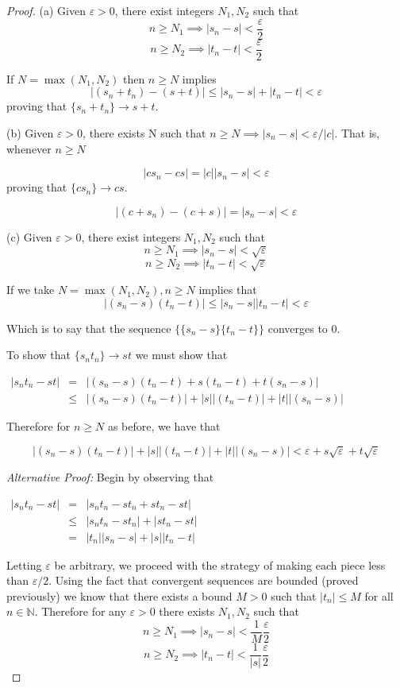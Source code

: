 \documentclass{tufte-book}
\theoremstyle{definition}
\numberwithin{section}{chapter}
\begin{document}
\begin{proof}
(a)  Given $\varepsilon > 0$, there exist integers $N_1, N_2$ such that 
\[n \geq N_1 \implies |s_n - s|< \frac{\varepsilon}{2}\]
\[n \geq N_2 \implies |t_n - t|< \frac{\varepsilon}{2}\]

If $N = \max(N_1, N_2)$ then $n\geq N$ implies
\[|(s_n + t_n)-(s + t)|\leq |s_n - s|+|t_n - t|<\varepsilon\] proving that $\{s_n + t_n\} \to s+t$.

(b)  Given $\varepsilon>0$, there exists N such that $n\geq N \implies |s_n-s|<\varepsilon/ |c|$.  That is, whenever $n\geq N$

\[|cs_n -cs |= |c||s_n - s|< \varepsilon\]  proving that $\{cs_n\} \to cs$.

\[|(c+s_n) - (c+s)| = |s_n - s| < \varepsilon\]

(c) Given $\varepsilon > 0$, there exist integers $N_1, N_2$ such that 
\[n \geq N_1 \implies |s_n - s|< \sqrt{\varepsilon}\]
\[n \geq N_2 \implies |t_n - t|< \sqrt{\varepsilon}\]

If we take $N = \max(N_1, N_2), n\geq N$ implies that 
\[|(s_n -s )(t_n -t)| \leq |s_n - s| |t_n -t| < \varepsilon\]

Which is to say that the sequence $\{\{s_n - s\}\{t_n - t\}\}$ converges to 0.

To show that $\{s_n t_n \} \to st$ we must show that 


$\begin{array} {lcl} 
|s_n t_n  - st|& = &|(s_n - s) (t_n - t) + s(t_n -t) + t(s_n - s)|\\ 


& \leq & |(s_n - s) (t_n - t)| + |s||(t_n -t) |+ |t||(s_n - s)|    \end{array}$

Therefore for $n  \geq N$ as before, we have that 

\[|(s_n - s) (t_n - t)| + |s||(t_n -t) |+ |t||(s_n - s)| < \varepsilon + s \sqrt{\varepsilon} + t \sqrt{\varepsilon}\]



\emph{Alternative Proof:}  Begin by observing that 


$\begin{array} {lcl} 
|s_n t_n  - st|& = &|s_n t_n - st_n + st_n  -st|\\ 
& \leq & |s_n t_n - st_n| + |st_n  -st|\\
&=	& |t_n||s_n - s| + |s||t_n - t| 
    \end{array}$
    
Letting $\varepsilon$ be arbitrary, we proceed with the strategy of making each piece less than $\varepsilon/2$.  Using the fact that convergent sequences are bounded (proved previously) we know that there exists a bound $M>0$ such that $|t_n|\leq M$ for all $n \in \mathbb{N}$.  Therefore for any $\varepsilon >0$ there exists $N_1, N_2$ such that 
\[n\geq N_1 \implies |s_n - s| <  \frac{1}{M}\frac{\varepsilon}{2}\]
\[n\geq N_2 \implies |t_n - t| <  \frac{1}{|s|}\frac{\varepsilon}{2}\]


\end{proof}
\end{document}
